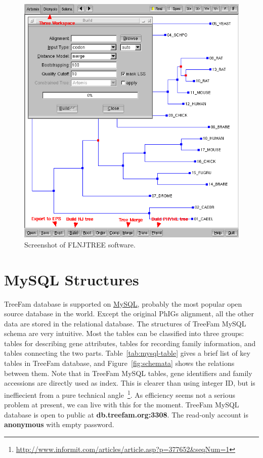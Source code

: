 \begin{figure}[!hb]
\includegraphics[width=\textwidth]{flnjtree.png}
\caption{Screenshot of FLNJTREE software.}\label{fig:flnjtree}
\end{figure}

\section{MySQL Structures}
TreeFam database is supported on \href{http://www.mysql.com/}{MySQL}, probably
the most popular open source database in the world. Except the original
PhIGs alignment, all the other data are stored in the relational database.
The structures of TreeFam MySQL schema are very intuitive.
Most the tables can be classified into three groups: tables for describing
gene attributes, tables for recording family information, and tables connecting
the two parts. Table~\ref{tab:mysql-table} gives a brief list of key tables
in TreeFam database, and Figure~\ref{fig:schemata} shows the relations between them.
Note that in TreeFam MySQL tables, gene identifiers and family accessions are
directly used as index. This is clearer than using integer ID, but is ineffiecient from
a pure technical angle~\footnote{\href{http://www.informit.com/articles/article.asp?p=377652\&seqNum=1}
{http://www.informit.com/articles/article.asp?p=377652\&seqNum=1}}. As efficiency seems not a serious problem at present,
we can live with this for the moment. TreeFam MySQL database is open to public at
{\bf db.treefam.org:3308}. The read-only account is {\bf anonymous} with empty password.

